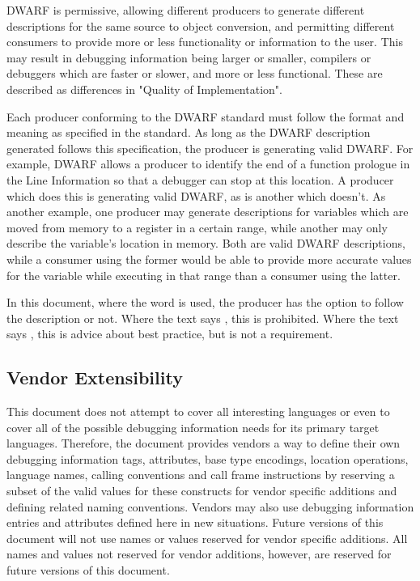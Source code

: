 DWARF is permissive, allowing different producers to generate different
descriptions for the same source to object conversion, and permitting
different consumers to provide more or less functionality or information
to the user.  This may result in debugging information being larger or
smaller, compilers or debuggers which are faster or slower, and more or
less functional.  These are described as differences in "Quality of
Implementation".

Each producer conforming to the DWARF standard must follow the format and
meaning as specified in the standard.  As long as the DWARF description
generated follows this specification, the producer is generating valid DWARF.
For example, DWARF allows a producer to identify the end of a function
prologue in the Line Information so that a debugger can stop at this location.
A producer which does this is generating valid DWARF, as is another which
doesn't.  As another example, one producer may generate descriptions
for variables which are moved from memory to a register in a certain range,
while another may only describe the variable's location in memory.  Both are
valid DWARF descriptions, while a consumer using the former would be able
to provide more accurate values for the variable while executing in that
range than a consumer using the latter.

\bb
In this document, where the word  is used, the producer has 
the option to follow the description or not.  Where the text says 
, this is prohibited.  Where the text says , 
this is advice about best practice, but is not a requirement.
\eb

\subsection{Vendor Extensibility}
This document does not attempt to cover all interesting
languages or even to cover all of the possible debugging
information needs for its primary target languages. 
Therefore,
the document provides vendors a way to define their own
debugging information tags, attributes, base type encodings,
location operations, language names, calling conventions and
call frame instructions by reserving a subset of the valid
values for these constructs for vendor specific additions
and defining related naming conventions. 
Vendors may also use
debugging information entries and attributes defined here in
new situations. 
Future versions of this document will not use
names or values reserved for vendor specific additions. 
All names and values not reserved for vendor additions, however,
are reserved for future versions of this document.

